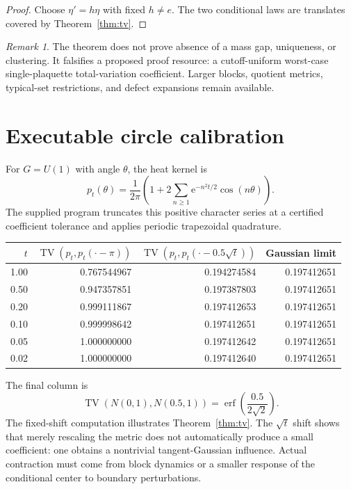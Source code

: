 \documentclass[11pt]{article}
\newcommand{\TV}{\operatorname{TV}}
\newcommand{\e}{\mathrm e}
\theoremstyle{remark}
\newtheorem{remark}[definition]{Remark}
\begin{document}
\begin{proof}
Choose $\eta'=h\eta$ with fixed $h\ne e$.  The two conditional laws are
translates covered by Theorem~\ref{thm:tv}.
\end{proof}

\begin{remark}
The theorem does not prove absence of a mass gap, uniqueness, or clustering.
It falsifies a proposed proof resource: a cutoff-uniform worst-case
single-plaquette total-variation coefficient.  Larger blocks, quotient
metrics, typical-set restrictions, and defect expansions remain available.
\end{remark}

\section{Executable circle calibration}

For $G=U(1)$ with angle $\theta$, the heat kernel is
\begin{equation}\label{eq:circle}
 p_t(\theta)=\frac1{2\pi}
 \left(1+2\sum_{n\ge1}\e^{-n^2t/2}\cos(n\theta)\right).
\end{equation}
The supplied program truncates this positive character series at a certified
coefficient tolerance and applies periodic trapezoidal quadrature.

\begin{center}
\begin{tabular}{rrrr}
\toprule
$t$ & $\TV(p_t,p_t(\cdot-\pi))$ &
$\TV(p_t,p_t(\cdot-0.5\sqrt t))$ & Gaussian limit\\
\midrule
1.00 & 0.767544967 & 0.194274584 & 0.197412651\\
0.50 & 0.947357851 & 0.197387803 & 0.197412651\\
0.20 & 0.999111867 & 0.197412653 & 0.197412651\\
0.10 & 0.999998642 & 0.197412651 & 0.197412651\\
0.05 & 1.000000000 & 0.197412642 & 0.197412651\\
0.02 & 1.000000000 & 0.197412640 & 0.197412651\\
\bottomrule
\end{tabular}
\end{center}

The final column is
\[
 \TV(N(0,1),N(0.5,1))
 =\operatorname{erf}\left(\frac{0.5}{2\sqrt2}\right).
\]
The fixed-shift computation illustrates Theorem~\ref{thm:tv}.  The
$\sqrt t$ shift shows that merely rescaling the metric does not automatically
produce a small coefficient: one obtains a nontrivial tangent-Gaussian
influence.  Actual contraction must come from block dynamics or a smaller
response of the conditional center to boundary perturbations.
\end{document}
